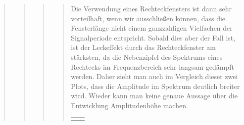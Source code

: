 \begin{quote}
\begin{quote}
\begin{quote}
\begin{quote}
        		Die Verwendung eines Rechteckfensters ist dann sehr vorteilhaft, wenn
        		wir ausschließen können, dass die Fensterlänge nicht einem
        		ganzzahligen Vielfachen der Signalperiode entspricht. Sobald dies aber
        		der Fall ist, ist der Leckeffekt durch das Rechteckfenster am
        		stärksten, da die Nebenzipfel des Spektrums eines Rechtecks im
        		Frequenzbereich sehr langsam gedämpft werden. Daher sieht man auch im
        		Vergleich dieser zwei Plots, dass die Amplitude im Spektrum
        		deutlich breiter wird. Wieder kann man keine genaue Aussage über die
        		Entwicklung Amplitudenhöhe machen.
        		
                \begin{center}
                \begin{tabular}{ll}
    
                \hspace{-11em}
                    \begin{minipage}{0.6\textwidth}
    

\end{minipage}
\end{tabular}
\end{center}
\end{quote}
\end{quote}
\end{quote}
\end{quote}
